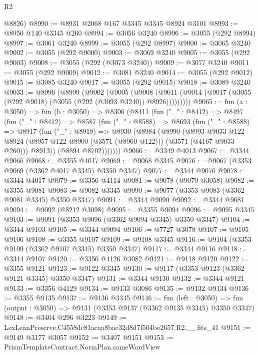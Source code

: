 \begin{lexlean}{R2}
\begin{coremodule}
      @8826)
@8990 := @8931 @2068 @167 @3345 @3345 @8924 @3101
@8993 := @8950 @140 @3345 @260
@8994 := @3056 @3240
@8996 := @3055 (@292 @8994)
@8997 := @3061 @3240
@8999 := @3055 (@292 @8997)
@9000 := @3065 @3240
@9002 := @3055 (@292 @9000)
@9003 := @3069 @3240
@9005 := @3055 (@292 @9003)
@9008 := @3055 (@292 (@3073 @3240))
@9009 := @3077 @3240
@9011 := @3055 (@292 @9009)
@9012 := @3081 @3240
@9014 := @3055 (@292 @9012)
@9015 := @3085 @3240
@9017 := @3055 (@292 @9015)
@9018 := @3089 @3240
@9033 := @8996
    (@8999
      (@9002
        (@9005
          (@9008 (@9011 (@9014 (@9017 (@3055 (@292 @9018) (@3055 (@292 (@3093 @3240)) @8926)))))))))
@9065 := fun (a : @3050) =>
  fun (b : @3050) =>
  @8306
    (@8411
      (fun ("_" : @8412) =>
      @8497
        (fun ("_" : @8412) =>
        @8587
          (fun ("_" : @8588) =>
          @8693
            (fun ("_" : @8588) =>
            @8917
              (fun ("_" : @8918) =>
              @8930
                (@8984
                  (@8990
                    (@8993
                      @9033
                      @122
                      @8924
                      (@8957 @122 @8900 (@3571 (@8960 @122)))
                      (@3571 (@4167 @9033 @260)))
                    @8913))
                (@8894 @8702)))))))
@9066 := @3349 @4013
@9067 := @3344 @9066
@9068 := @3355 @4017
@9069 := @9068 @3345
@9076 := @9067 (@3353 @9069 (@3362 @4017 @3345) @3350 @3347)
@9077 := @3344 @9076
@9078 := @3344 @4017
@9079 := @3356 @4114
@9081 := @9078 (@9079 @3058)
@9082 := @3355 @9081
@9083 := @9082 @3345
@9090 := @9077 (@3353 @9083 (@3362 @9081 @3345) @3350 @3347)
@9091 := @3344 @9090
@9092 := @3344 @9081
@9094 := @9092 (@8212 @3098)
@9095 := @3355 @9094
@9096 := @9095 @3345
@9103 := @9091 (@3353 @9096 (@3362 @9094 @3345) @3350 @3347)
@9104 := @3344 @9103
@9105 := @3344 @9094
@9106 := @7727 @3078
@9107 := @9105 @9106
@9108 := @3355 @9107
@9109 := @9108 @3345
@9116 := @9104 (@3353 @9109 (@3362 @9107 @3345) @3350 @3347)
@9117 := @3344 @9116
@9118 := @3344 @9107
@9120 := @3356 @4126 @3082
@9121 := @9118 @9120
@9122 := @3355 @9121
@9123 := @9122 @3345
@9130 := @9117 (@3353 @9123 (@3362 @9121 @3345) @3350 @3347)
@9131 := @3344 @9130
@9132 := @3344 @9121
@9133 := @3356 @4129
@9134 := @9133 @3086
@9135 := @9132 @9134
@9136 := @3355 @9135
@9137 := @9136 @3345
@9146 := fun (left : @3050) =>
  fun (output : @3050) => @9131 (@3353 @9137 (@3362 @9135 @3345) @3350 @3347)
@9148 := @3404 @296 @3223
@9149 := LexLeanPreserve.C4558dc81acaa8bac32d8d7f504be2657.R2.__fits_41
@9151 := @9149 @3177 @3057
@9152 := @3407 @9151
@9153 := PrismTemplateContract.NormPlan.sameWordView

\end{coremodule}
\end{lexlean}
